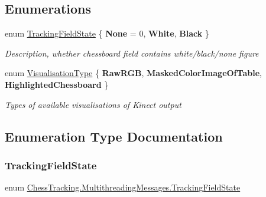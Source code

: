 \subsection*{Enumerations}
\begin{DoxyCompactItemize}
\item 
enum \mbox{\hyperlink{namespace_chess_tracking_1_1_multithreading_messages_ac10ea87452f4fb70b8c6abe5792fcb92}{Tracking\+Field\+State}} \{ {\bfseries None} = 0, 
{\bfseries White}, 
{\bfseries Black}
 \}
\begin{DoxyCompactList}\small\item\em Description, whether chessboard field contains white/black/none figure \end{DoxyCompactList}\item 
enum \mbox{\hyperlink{namespace_chess_tracking_1_1_multithreading_messages_ade9732699402e25965677a767015ce90}{Visualisation\+Type}} \{ {\bfseries Raw\+R\+GB}, 
{\bfseries Masked\+Color\+Image\+Of\+Table}, 
{\bfseries Highlighted\+Chessboard}
 \}
\begin{DoxyCompactList}\small\item\em Types of available visualisations of Kinect output \end{DoxyCompactList}\end{DoxyCompactItemize}


\subsection{Enumeration Type Documentation}
\mbox{\label{namespace_chess_tracking_1_1_multithreading_messages_ac10ea87452f4fb70b8c6abe5792fcb92}} 
\subsubsection{\texorpdfstring{TrackingFieldState}{TrackingFieldState}}
{\footnotesize\ttfamily enum \mbox{\hyperlink{namespace_chess_tracking_1_1_multithreading_messages_ac10ea87452f4fb70b8c6abe5792fcb92}{Chess\+Tracking.\+Multithreading\+Messages.\+Tracking\+Field\+State}}\hspace{0.3cm}{\ttfamily [strong]}}



